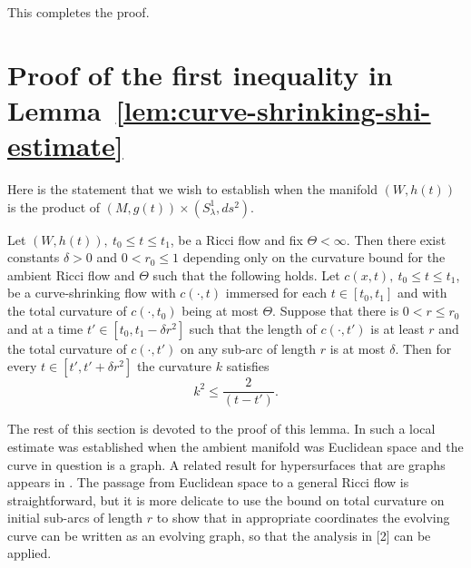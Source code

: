 This completes the proof.


\section{Proof of the first inequality in Lemma~{\ref{lem:curve-shrinking-shi-estimate}}}\label{18.6}

Here is the statement that we wish to establish when the manifold
$(W,h(t))$ is the product of $(M,g(t))\times (S^1_\lambda,ds^2)$.


\begin{lemma}
\label{lem:curve-shrinking-shi-estimate-first-inequality}
\label{csshi1}
Let $(W,h(t)),\ t_0\le t\le t_1$, be a Ricci flow and fix
$\Theta<\infty$. Then there exist constants $\delta>0$ and $0<r_0\le
1$   depending only on the curvature bound for the ambient Ricci
flow and $\Theta$ such that the following holds. Let $c(x,t),\
t_0\le t\le t_1$, be a curve-shrinking flow with $c(\cdot,t)$
immersed for each $t\in [t_0,t_1]$ and with the total curvature of
$c(\cdot,t_0)$ being at most $\Theta$. Suppose that there is $0<r\le
r_0$ and at a time $t'\in [t_0,t_1-\delta r^2]$ such that the length
of $c(\cdot,t')$ is at least $r$ and the total curvature of
$c(\cdot,t')$ on any sub-arc of length $r$ is at most $\delta$. Then
for every $t\in [t',t'+\delta r^2]$ the curvature $k$ satisfies
$$k^2\le  \frac{2}{(t-t')}.$$
\end{lemma}

The rest of this section is devoted to the proof of this lemma. In
\cite{AG} such a local estimate was established when the ambient
manifold was Euclidean space and the curve in question is a graph. A
related result for hypersurfaces that are graphs appears in
\cite{EckerHuisken}. The passage from Euclidean space to a general
Ricci flow is straightforward, but it is more delicate to use the
bound on total curvature on initial sub-arcs of length $r$ to show
that in appropriate coordinates the evolving curve can be written as
an evolving graph, so that the analysis in [2] can be applied.

